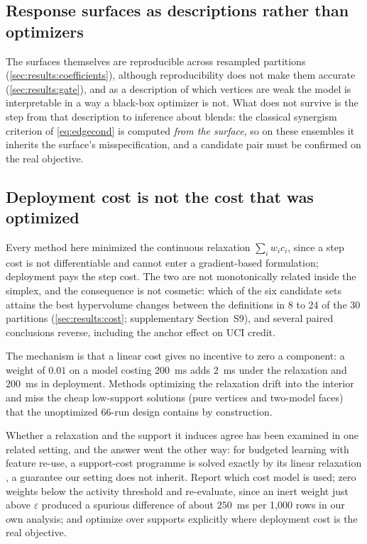 \subsection{Response surfaces as descriptions rather than optimizers}
\label{sec:disc:description}

The surfaces themselves are reproducible across resampled partitions (\cref{sec:results:coefficients}), although
reproducibility does not make them accurate (\cref{sec:results:gate}), and as a description of which vertices are weak
the model is interpretable in a way a black-box optimizer is not. What does not survive is the step from that
description to inference about blends: the classical synergism criterion of \cref{eq:edgecond} is computed
\emph{from the surface}, so on these ensembles it inherits the surface's misspecification, and a candidate pair must
be confirmed on the real objective.

\subsection{Deployment cost is not the cost that was optimized}
\label{sec:disc:cost}

Every method here minimized the continuous relaxation $\sum_i w_i c_i$, since a step cost is not differentiable and
cannot enter a gradient-based formulation; deployment pays the step cost. The two are not monotonically related inside
the simplex, and the consequence is not cosmetic: which of the six candidate sets attains the best hypervolume changes
between the definitions in 8 to 24 of the 30 partitions (\cref{sec:results:cost}; supplementary Section~S9), and
several paired conclusions reverse, including the anchor effect on UCI credit.

The mechanism is that a linear cost gives no incentive to zero a component: a weight of $0.01$ on a model costing
$200$~ms adds $2$~ms under the relaxation and $200$~ms in deployment. Methods optimizing the relaxation drift into the
interior and miss the cheap low-support solutions (pure vertices and two-model faces) that the unoptimized
66-run design contains by construction.

Whether a relaxation and the support it induces agree has been examined in one related setting, and the answer went
the other way: for budgeted learning with feature re-use, a support-cost programme is solved exactly by its linear
relaxation \citep{nan2016pruning}, a guarantee our setting does not inherit. Report which cost model is used; zero
weights below the activity threshold and re-evaluate, since an inert weight just above $\varepsilon$ produced a
spurious difference of about $250$~ms per 1{,}000 rows in our own analysis; and optimize over supports explicitly
where deployment cost is the
real objective.

